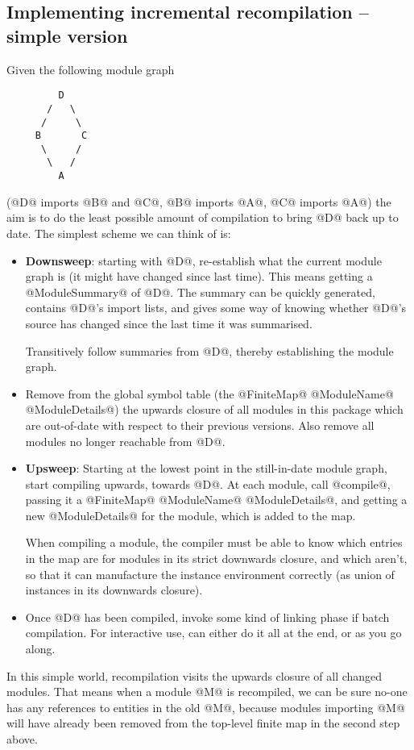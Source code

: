 \documentclass[11pt]{article}
\begin{document}
\subsection{Implementing incremental recompilation -- simple version}
Given the following module graph
\begin{verbatim}
         D
       /   \
      /     \
     B       C
      \     /
       \   /
         A
\end{verbatim}
(@D@ imports @B@ and @C@, @B@ imports @A@, @C@ imports @A@) the aim is to do the
least possible amount of compilation to bring @D@ back up to date.  The
simplest scheme we can think of is:
\begin{itemize}
\item {\bf Downsweep}: 
  starting with @D@, re-establish what the current module graph is
  (it might have changed since last time).  This means getting a
  @ModuleSummary@ of @D@.  The summary can be quickly generated,
  contains @D@'s import lists, and gives some way of knowing whether
  @D@'s source has changed since the last time it was summarised.

  Transitively follow summaries from @D@, thereby establishing the
  module graph.
\item
  Remove from the global symbol table (the @FiniteMap@ @ModuleName@
  @ModuleDetails@) the upwards closure of all modules in this package
  which are out-of-date with respect to their previous versions.  Also
  remove all modules no longer reachable from @D@.
\item {\bf Upsweep}:
  Starting at the lowest point in the still-in-date module graph,
  start compiling upwards, towards @D@.  At each module, call
  @compile@, passing it a @FiniteMap@ @ModuleName@ @ModuleDetails@,
  and getting a new @ModuleDetails@ for the module, which is added to
  the map.

  When compiling a module, the compiler must be able to know which
  entries in the map are for modules in its strict downwards closure,
  and which aren't, so that it can manufacture the instance
  environment correctly (as union of instances in its downwards
  closure).
\item
  Once @D@ has been compiled, invoke some kind of linking phase
  if batch compilation.  For interactive use, can either do it all
  at the end, or as you go along.
\end{itemize}
In this simple world, recompilation visits the upwards closure of
all changed modules.  That means when a module @M@ is recompiled,
we can be sure no-one has any references to entities in the old @M@,
because modules importing @M@ will have already been removed from the 
top-level finite map in the second step above.
\end{document}
